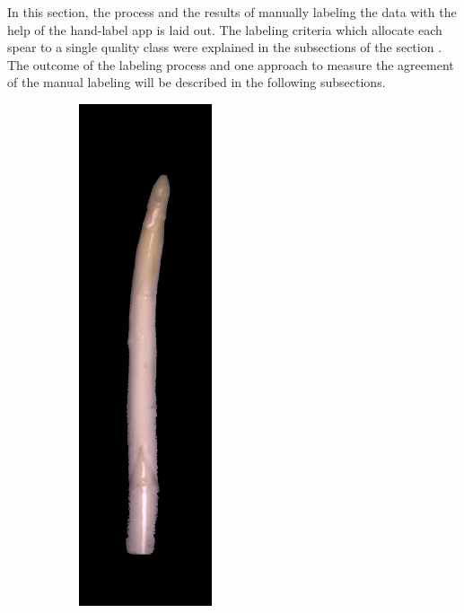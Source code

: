 In this section, the process and the results of manually labeling the data with the help of the hand-label app is laid out. The labeling criteria which allocate each spear to a single quality class were explained in the subsections of the section . The outcome of the labeling process and one approach to measure the agreement of the manual labeling will be described in the following subsections.

\begin{figure}[!htb]
	\centering
	\vspace{20pt}
	\begin{subfigure}{0.3\textwidth}
		\includegraphics[width=0.80\linewidth]{Figures/chapter03/diff-img-bent.png}

\end{subfigure}
\end{figure}

